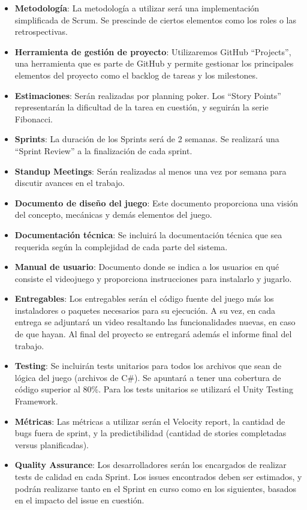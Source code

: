 \documentclass[a4paper]{article}
\begin{document}
\begin{itemize}
    \item \textbf{Metodología}: La metodología a utilizar será una implementación simplificada de Scrum. Se prescinde de ciertos elementos como los roles o las retrospectivas.
    \item \textbf{Herramienta de gestión de proyecto}: Utilizaremos GitHub “Projects”, una herramienta que es parte de GitHub y permite gestionar los principales elementos del proyecto como el backlog de tareas y los milestones.
    \item \textbf{Estimaciones}: Serán realizadas por planning poker. Los “Story Points” representarán la dificultad de la tarea en cuestión, y seguirán la serie Fibonacci.
    \item \textbf{Sprints}: La duración de los Sprints será de 2 semanas. Se realizará una “Sprint Review” a la finalización de cada sprint.
    \item \textbf{Standup Meetings}: Serán realizadas al menos una vez por semana para discutir avances en el trabajo.
    \item \textbf{Documento de diseño del juego}: Este documento proporciona una visión del concepto, mecánicas y demás elementos del juego.
    \item \textbf{Documentación técnica}: Se incluirá la documentación técnica que sea requerida según la complejidad de cada parte del sistema.
    \item \textbf{Manual de usuario}: Documento donde se indica a los usuarios en qué consiste el videojuego y proporciona instrucciones para instalarlo y jugarlo.
    \item \textbf{Entregables}: Los entregables serán el código fuente del juego más los instaladores o paquetes necesarios para su ejecución. A su vez, en cada entrega se adjuntará un video resaltando las funcionalidades nuevas, en caso de que hayan. Al final del proyecto se entregará además el informe final del trabajo.
    \item \textbf{Testing}: Se incluirán tests unitarios para todos los archivos que sean de lógica del juego (archivos de C\#). Se apuntará a tener una cobertura de código superior al 80\%. Para los tests unitarios se utilizará el Unity Testing Framework.
    \item \textbf{Métricas}: Las métricas a utilizar serán el Velocity report, la cantidad de bugs fuera de sprint, y la predictibilidad (cantidad de stories completadas versus planificadas).
    \item \textbf{Quality Assurance}: Los desarrolladores serán los encargados de realizar tests de calidad en cada Sprint. Los issues encontrados deben ser estimados, y podrán realizarse tanto en el Sprint en curso como en los siguientes, basados en el impacto del issue en cuestión.

\end{itemize}
\end{document}
